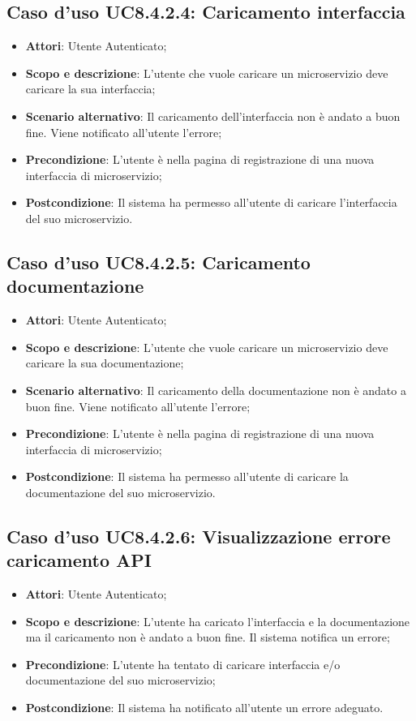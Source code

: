 \documentclass[12pt,a4paper,titlepage]{article}
\begin{document}
	\subsection{Caso d'uso UC8.4.2.4: Caricamento interfaccia}
	\label{UC8.4.2.4}
	\begin{itemize}
		\item \textbf{Attori}: Utente Autenticato;
		\item \textbf{Scopo e descrizione}: L'utente che vuole caricare un microservizio deve caricare la sua interfaccia;
		\item \textbf{Scenario alternativo}: Il caricamento dell'interfaccia non è andato a buon fine. Viene notificato all'utente l'errore;
		\item \textbf{Precondizione}: L'utente è nella pagina di registrazione di una nuova interfaccia di microservizio;
		\item \textbf{Postcondizione}: Il sistema ha permesso all'utente di caricare l'interfaccia del suo microservizio.
	\end{itemize}
	\subsection{Caso d'uso UC8.4.2.5: Caricamento documentazione}
	\label{UC8.4.2.5}
	\begin{itemize}
		\item \textbf{Attori}: Utente Autenticato;
		\item \textbf{Scopo e descrizione}: L'utente che vuole caricare un microservizio deve caricare la sua documentazione;
		\item \textbf{Scenario alternativo}: Il caricamento della documentazione non è andato a buon fine. Viene notificato all'utente l'errore;
		\item \textbf{Precondizione}: L'utente è nella pagina di registrazione di una nuova interfaccia di microservizio;
		\item \textbf{Postcondizione}: Il sistema ha permesso all'utente di caricare la documentazione del suo microservizio.
	\end{itemize}
	\subsection{Caso d'uso UC8.4.2.6: Visualizzazione errore caricamento API}
	\label{UC8.4.2.6}
	\begin{itemize}
		\item \textbf{Attori}: Utente Autenticato;
		\item \textbf{Scopo e descrizione}: L'utente ha caricato l'interfaccia e la documentazione ma il caricamento non è andato a buon fine. Il sistema notifica un errore;
		\item \textbf{Precondizione}: L'utente ha tentato di caricare interfaccia e/o documentazione del suo microservizio;
		\item \textbf{Postcondizione}: Il sistema ha notificato all'utente un errore adeguato.
	\end{itemize}
\end{document}
